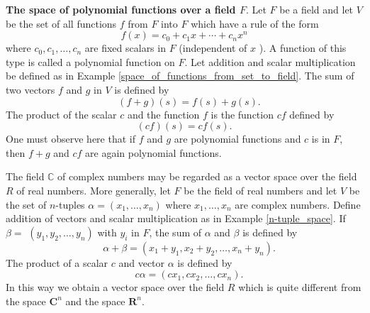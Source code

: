 \documentclass[main.tex]{subfiles}
\begin{document}
\begin{example}\label{example_4}
\textbf{The space of polynomial functions over a field $F$}. Let $F$ be a field and let $V$ be the set of all functions $f$ from $F$ into $F$ which have a rule of the form
$$
f(x)=c_0+c_1 x+\cdots+c_n x^n
$$
where $c_0, c_1, \ldots, c_n$ are fixed scalars in $F$ (independent of $x$ ). A function of this type is called a polynomial function on $F$. Let addition and scalar multiplication be defined as in Example \ref{space_of_functions_from_set_to_field}. The sum of two vectors $f$ and $g$ in $V$ is defined by
$$\quad(f+g)(s)=f(s)+g(s).$$
The product of the scalar $c$ and the function $f$ is the function $c f$ defined by
$$
(c f)(s)=c f(s) .
$$
One must observe here that if $f$ and $g$ are polynomial functions and $c$ is in $F$, then $f+g$ and $c f$ are again polynomial functions.
\end{example}

\begin{example}
The field $\mathbb{C}$ of complex numbers may be regarded as a vector space over the field $R$ of real numbers. More generally, let $F$ be the field of real numbers and let $V$ be the set of $n$-tuples $\alpha=\left(x_1, \ldots, x_n\right)$ where $x_1, \ldots, x_n$ are complex numbers. Define addition of vectors and scalar multiplication as in Example \ref{n-tuple_space}. If $\beta=$ $\left(y_1, y_2, \ldots, y_n\right)$ with $y_i$ in $F$, the sum of $\alpha$ and $\beta$ is defined by
$$\quad \alpha+\beta=\left(x_1+y_1, x_2+y_2, \ldots, x_n+y_n\right).$$
The product of a scalar $c$ and vector $\alpha$ is defined by
$$\quad c \alpha=\left(c x_1, c x_2, \ldots, c x_n\right).$$ In this way we obtain a vector space over the field $R$ which is quite different from the space $\mathbf{C}^n$ and the space $\mathbf{R}^n$.
\end{example}
\end{document}
